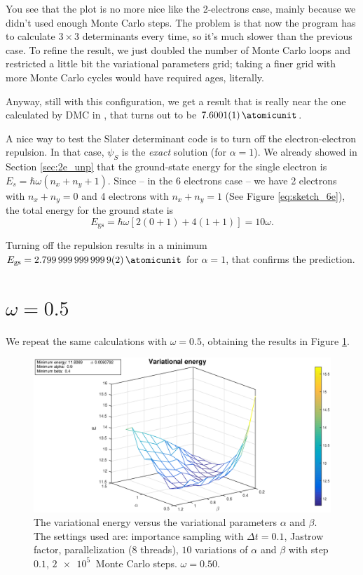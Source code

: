 \documentclass[a4paper,twoside,11pt]{book}
\begin{document}
You see that the plot is no more nice like the 2-electrons case, mainly because we didn't used enough Monte Carlo steps. The problem is that now the program has to calculate $3 \times 3$ determinants every time, so it's much slower than the previous case. To refine the result, we just doubled the number of Monte Carlo loops and restricted a little bit the variational parameters grid; taking a finer grid with more Monte Carlo cycles would have required ages, literally.

Anyway, still with this configuration, we get a result that is really near the one calculated by DMC in \cite{PedersenLohne2011}, that turns out to be $\SI{7.6001 \pm 0.0001}{\atomicunit}$.

A nice way to test the Slater determinant code is to turn off the electron-electron repulsion. In that case, $\psi_S$ is the \emph{exact} solution (for $\alpha = 1$). We already showed in Section \ref{sec:2e_unp} that the ground-state energy for the single electron is $E_s = \hbar\omega(n_x + n_y + 1)$. Since -- in the 6 electrons case -- we have 2 electrons with $n_x + n_y = 0$ and 4 electrons with $n_x + n_y = 1$ (See Figure \ref{eq:sketch_6e}), the total energy for the ground state is
\begin{equation}
	E_{\text{gs}} = \hbar\omega\left[2(0+1)+4(1+1)\right] = 10\omega.
\end{equation}

Turning off the repulsion results in a minimum $E_{\text{gs}} = \SI{2.7999999999999 \pm 0.0000000000002}{\atomicunit}$ for $\alpha=1$, that confirms the prediction.

\section{$\omega = 0.5$}
We repeat the same calculations with $\omega=0.5$, obtaining the results in Figure \ref{fig:6e-050-rep}.
\begin{figure}[H]
	\centering
	\includegraphics[width=\textwidth]{6e-050-rep}
	\caption{The variational energy versus the variational parameters $\alpha$ and $\beta$. The settings used are: importance sampling with $\Delta t = 0.1$, Jastrow factor, parallelization (8 threads), $10$ variations of $\alpha$ and $\beta$ with step $0.1$, $\SI{2e5}{}$ Monte Carlo steps. $\omega=0.50$.}
	\label{fig:6e-050-rep}
\end{figure}
\end{document}

